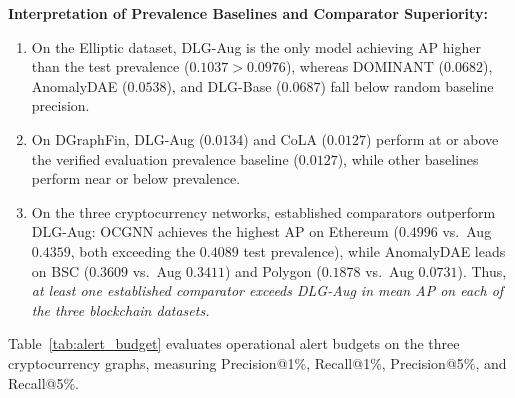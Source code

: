 \documentclass[applsci,article,submit,moreauthors,pdftex]{Definitions/mdpi}
\begin{document}
\textbf{Interpretation of Prevalence Baselines and Comparator Superiority:}
\begin{enumerate}
    \item On the Elliptic dataset, DLG-Aug is the only model achieving AP higher than the test prevalence ($0.1037 > 0.0976$), whereas DOMINANT ($0.0682$), AnomalyDAE ($0.0538$), and DLG-Base ($0.0687$) fall below random baseline precision.
    \item On DGraphFin, DLG-Aug ($0.0134$) and CoLA ($0.0127$) perform at or above the verified evaluation prevalence baseline ($0.0127$), while other baselines perform near or below prevalence.
    \item On the three cryptocurrency networks, established comparators outperform DLG-Aug: OCGNN achieves the highest AP on Ethereum ($0.4996$ vs.\ Aug $0.4359$, both exceeding the $0.4089$ test prevalence), while AnomalyDAE leads on BSC ($0.3609$ vs.\ Aug $0.3411$) and Polygon ($0.1878$ vs.\ Aug $0.0731$). Thus, \textit{at least one established comparator exceeds DLG-Aug in mean AP on each of the three blockchain datasets.}
\end{enumerate}

Table~\ref{tab:alert_budget} evaluates operational alert budgets on the three cryptocurrency graphs, measuring Precision@1\%, Recall@1\%, Precision@5\%, and Recall@5\%.
\end{document}
